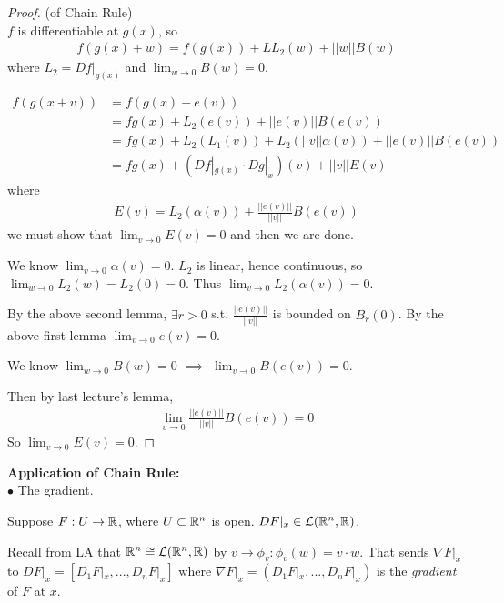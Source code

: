 \documentclass[a4paper]{article}
\begin{document}
\begin{proof} (of Chain Rule)\\
$f$ is differentiable at $g(x)$, so
\begin{equation*}
\begin{aligned}
f(g(x)+w)=f(g(x))+LL_2(w)+||w||B(w)
\end{aligned}
\end{equation*}
where $L_2 = Df|_{g(x)}$ and $\lim_{w \to 0}B(w)=0$.

\begin{equation*}
\begin{aligned}
f(g(x+v))&=f(g(x)+e(v))\\
&=fg(x)+L_2(e(v))+||e(v)||B(e(v))\\
&=fg(x)+L_2(L_1(v))+L_2(||v||\alpha(v))+||e(v)||B(e(v))\\
&=fg(x)+(Df|_{g(x)}\cdot Dg|_x)(v)+||v||E(v)
\end{aligned}
\end{equation*}
where
\begin{equation*}
\begin{aligned}
E(v)=L_2(\alpha(v))+\frac{||e(v)||}{||v||}B(e(v))
\end{aligned}
\end{equation*}
we must show that $\lim_{v\to 0}E(v)=0$ and then we are done.

We know $\lim_{v\to 0}\alpha(v)=0$. $L_2$ is linear, hence continuous, so $\lim_{w\to 0}L_2(w)=L_2(0)=0$. Thus $\lim_{v\to 0} L_2(\alpha(v))=0$.

By the above second lemma, $\exists r>0$ s.t. $\frac{||e(v)||}{||v||}$ is bounded on $B_r(0)$. By the above first lemma $\lim_{v \to 0}e(v)=0$. 

We know $\lim_{w \to 0} B(w)=0$ $\implies$ $\lim_{v \to 0}B(e(v))=0$.

Then by last lecture's lemma,
\begin{equation*}
\begin{aligned}
\lim_{v \to 0}\frac{||e(v)||}{||v||}B(e(v))=0
\end{aligned}
\end{equation*}
So $\lim_{v \to 0}E(v)=0$.
\end{proof}

\textbf{Application of Chain Rule:}\\
$\bullet$ The gradient.

Suppose $F: U \to \mathbb{R}$, where $U \subset \mathbb{R}^n$ is open. $DF|_x \in \mathcal{L}(\mathbb{R}^n,\mathbb{R})$.

Recall from LA that $\mathbb{R}^n \cong \mathcal{L}(\mathbb{R}^n,\mathbb{R})$ by $v \to \phi_v:\phi_v(w)=v \cdot w$. That sends $\nabla F|_x$ to $DF|_x = [D_1F|_x,...,D_n F|_x]$ where $\nabla F|_x = (D_1F|_x,...,D_nF|_x)$ is the \emph{gradient} of $F$ at $x$.
\end{document}
